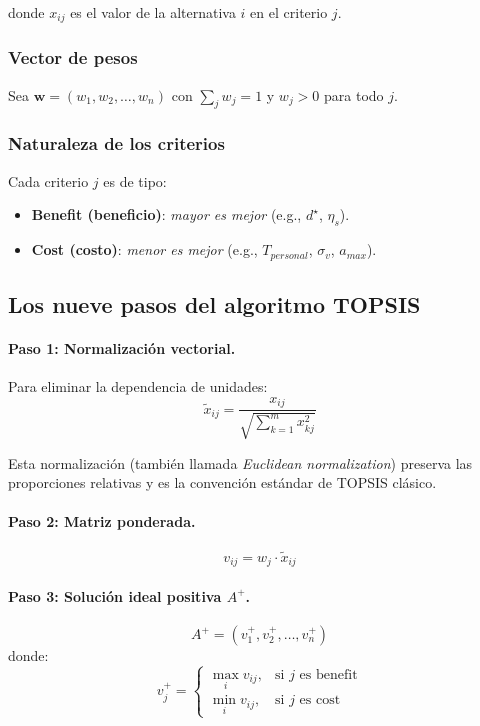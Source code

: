 \documentclass[12pt,a4paper,oneside]{book}
\begin{document}
donde $x_{ij}$ es el valor de la alternativa $i$ en el criterio $j$.

\subsubsection{Vector de pesos}

Sea $\mathbf{w} = (w_1, w_2, \ldots, w_n)$ con $\sum_j w_j = 1$ y $w_j > 0$ para todo $j$.

\subsubsection{Naturaleza de los criterios}

Cada criterio $j$ es de tipo:
\begin{itemize}
    \item \textbf{Benefit (beneficio)}: \emph{mayor es mejor} (e.g., $d^\star$, $\eta_s$).
    \item \textbf{Cost (costo)}: \emph{menor es mejor} (e.g., $T_{personal}$, $\sigma_v$, $a_{max}$).
\end{itemize}

\subsection{Los nueve pasos del algoritmo TOPSIS}

\paragraph{Paso 1: Normalización vectorial.} Para eliminar la dependencia de unidades:
\begin{equation}
\tilde{x}_{ij} = \frac{x_{ij}}{\sqrt{\sum_{k=1}^{m} x_{kj}^2}}
\label{doc5:eq:topsis1}
\end{equation}

Esta normalización (también llamada \emph{Euclidean normalization}) preserva las proporciones relativas y es la convención estándar de TOPSIS clásico.

\paragraph{Paso 2: Matriz ponderada.}
\begin{equation}
v_{ij} = w_j \cdot \tilde{x}_{ij}
\label{doc5:eq:topsis2}
\end{equation}

\paragraph{Paso 3: Solución ideal positiva $A^+$.}
\begin{equation}
A^+ = (v_1^+, v_2^+, \ldots, v_n^+)
\label{doc5:eq:topsis3}
\end{equation}
donde:
\begin{equation}
v_j^+ = \begin{cases}
\max_i v_{ij}, & \text{si } j \text{ es benefit} \\
\min_i v_{ij}, & \text{si } j \text{ es cost}
\end{cases}
\end{equation}
\end{document}
